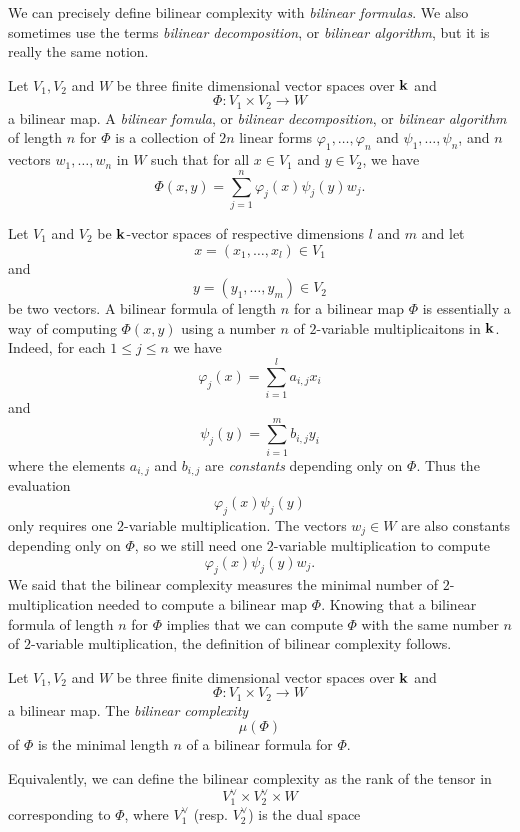 We can precisely define bilinear complexity with \emph{bilinear formulas}. We
also sometimes use the terms \emph{bilinear decomposition}, or \emph{bilinear
algorithm}, but it is really the same notion.
\begin{defi}
  \label{defi:bilinear-formula}
  Let $V_1, V_2$ and $W$ be three finite dimensional vector spaces over $\mathbf{k}$ and 
  \[
    \Phi:V_1\times V_2\to W
  \]
  a bilinear map. A \emph{bilinear fomula}, or \emph{bilinear decomposition}, or
  \emph{bilinear algorithm} of length $n$ for $\Phi$ is a
  collection of $2n$ linear forms $\varphi_1, \dots, \varphi_n$ and $\psi_1,
  \dots, \psi_n$, and $n$ vectors $w_1, \dots, w_n$ in $W$ such that for all
  $x\in V_1$ and $y\in V_2$, we have
  \[
    \Phi(x, y) = \sum_{j=1}^n \varphi_j(x)\psi_j(y)w_j.
  \]
\end{defi}
Let $V_1$ and $V_2$ be $\mathbf{k}$-vector spaces of respective dimensions $l$ and $m$
and let
\[
  x = (x_1, \dots, x_l)\in V_1
\]
and
\[
  y = (y_1, \dots, y_m)\in V_2
\]
be two vectors.
A bilinear formula of length $n$ for a bilinear map $\Phi$ is essentially a way
of computing $\Phi(x, y)$ using a number $n$ of $2$-variable multiplicaitons in $\mathbf{k}$.
Indeed, for each $1\leq j \leq n$ we have
\[
  \varphi_j(x) = \sum_{i=1}^l a_{i, j}x_i
\]
and
\[
  \psi_j(y) = \sum_{i=1}^m b_{i, j}y_i
\]
where the elements $a_{i, j}$ and $b_{i, j}$ are \emph{constants} depending only
on $\Phi$. Thus the evaluation
\[
  \varphi_j(x)\psi_j(y)
\]
only requires one $2$-variable multiplication. The vectors $w_j\in W$ are also
constants depending only on $\Phi$, so we still need one $2$-variable
multiplication to compute 
\[
  \varphi_j(x)\psi_j(y)w_j.
\]
We said that the bilinear complexity measures the minimal number of
$2$-multiplication needed to compute a bilinear map $\Phi$. Knowing that a
bilinear formula of length $n$ for $\Phi$ implies that we can compute $\Phi$
with the same number $n$ of $2$-variable multiplication, the definition of
bilinear complexity follows.
\begin{defi}
  Let $V_1, V_2$ and $W$ be three finite dimensional vector spaces over $\mathbf{k}$ and 
  \[
    \Phi:V_1\times V_2\to W
  \]
  a bilinear map. The \emph{bilinear complexity} 
  \[
    \mu(\Phi)
  \]
  of $\Phi$ is the minimal length $n$ of a bilinear formula for $\Phi$.
\end{defi}
Equivalently, we can define the bilinear complexity as the rank of the tensor in 
\[
  V_1^\vee \times V_2^\vee \times W
\]
corresponding to $\Phi$, where $V_1^\vee$ (resp. $V_2^\vee$) is the dual space
